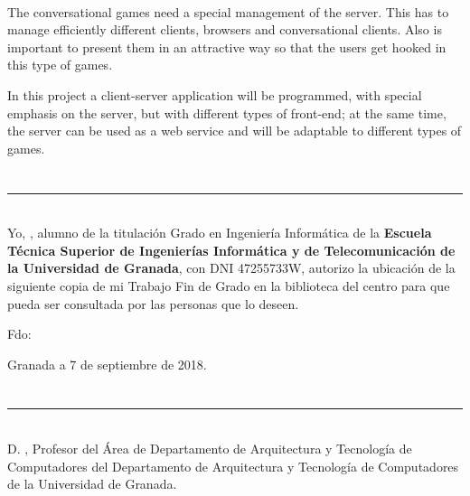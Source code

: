 \vspace{0.7cm}
\\

The conversational games need a special management of the server. This has to  manage  efficiently different clients, browsers and conversational clients. Also is important to present them in an attractive way so that the users get hooked in this type of games.

In this project a client-server application will be programmed, with special emphasis on the server, but with different types of front-end; at the same time, the server can be used as a web service and will be adaptable to different types of games.
\chapter*{}
\thispagestyle{empty}

\noindent\rule[-1ex]{\textwidth}{2pt}\\[4.5ex]

Yo, \textbf{\myName}, alumno de la titulación Grado en Ingeniería Informática de la \textbf{Escuela Técnica Superior
de Ingenierías Informática y de Telecomunicación de la Universidad de Granada}, con DNI 47255733W, autorizo la
ubicación de la siguiente copia de mi Trabajo Fin de Grado en la biblioteca del centro para que pueda ser
consultada por las personas que lo deseen.

\vspace{6cm}

\noindent Fdo: \myName

\vspace{2cm}

\begin{flushright}
Granada a 7 de septiembre de 2018.
\end{flushright}


\chapter*{}
\thispagestyle{empty}

\noindent\rule[-1ex]{\textwidth}{2pt}\\[4.5ex]

D. \textbf{\myProf}, Profesor del Área de  Departamento de Arquitectura y Tecnología de Computadores del Departamento de Arquitectura y Tecnología de Computadores de la Universidad de Granada.

\vspace{0.5cm}


